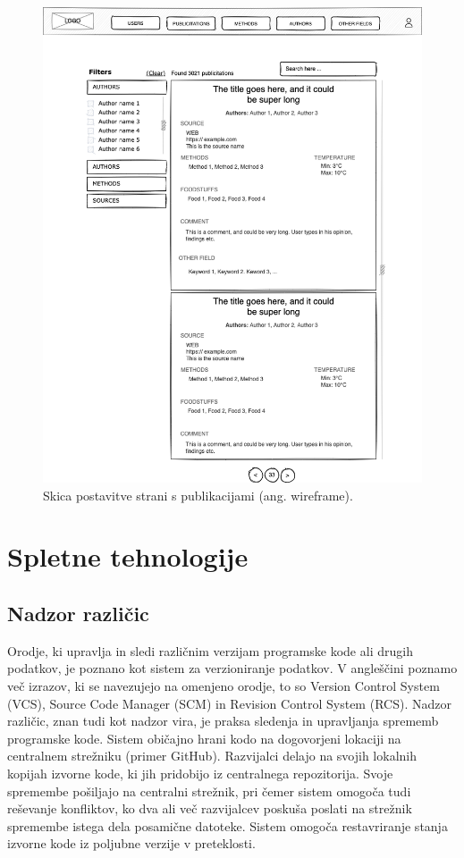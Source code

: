 \documentclass[a4paper, 12pt]{book}
\begin{document}
\begin{figure}[h]
\begin{center}
\includegraphics[width=1\textwidth]{slike/wireframe.png}
\end{center}
\caption{ Skica postavitve strani s publikacijami (ang. wireframe). }
\label{wireframe}
\end{figure}

\clearpage

\section{Spletne tehnologije}
\subsection{Nadzor različic}
\label{version-control}
Orodje, ki upravlja in sledi različnim verzijam programske kode ali drugih podatkov, je poznano kot sistem za verzioniranje podatkov. V angleščini poznamo več izrazov, ki se navezujejo na omenjeno orodje, to so Version Control System (VCS), Source Code Manager (SCM) in Revision Control System (RCS). Nadzor različic, znan tudi kot nadzor vira, je praksa sledenja in upravljanja sprememb programske kode. Sistem običajno hrani kodo na dogovorjeni lokaciji na centralnem strežniku (primer GitHub). Razvijalci delajo na svojih lokalnih kopijah izvorne kode, ki jih pridobijo iz centralnega repozitorija. Svoje spremembe pošiljajo na centralni strežnik, pri čemer sistem omogoča tudi reševanje konfliktov, ko dva ali več razvijalcev poskuša poslati na strežnik spremembe istega dela posamične datoteke. Sistem omogoča restavriranje stanja izvorne kode iz poljubne verzije v preteklosti.
\end{document}
